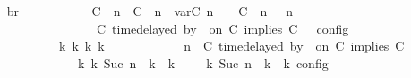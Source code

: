 \begin{isabellebody}
\ \isamarkupfalse%
\ br{}{\isacharprime}{\isacharcolon}\isanewline
\ \ \ \ \ \ \ \ {\isacartoucheopen}{\isasymrho}\ {\isasymin}\ {\isasymlbrakk}\ {\isacharparenleft}{\isacharparenleft}C\ {\isasymUp}\ n{\isacharparenright}\ {\isacharhash}\ {\isacharparenleft}C\ {\isasymDown}\ n\ {\isacharat}{\isasymsharp}\ {\isasymlparr}{\isasymtau}\isactrlsub v\isactrlsub a\isactrlsub r{\isacharparenleft}C\ n{\isacharparenright}\ {\isasymoplus}\ {\isasymdelta}{\isasymtau}{\isasymrparr}{\isacharparenright}\ {\isacharhash}\ {\isacharparenleft}C\ {\isasymUp}\ n{\isacharparenright}\ {\isacharhash}\ {\isasymGamma}{\isacharparenright}{\isacharcomma}\ n\isanewline
\ \ \ \ \ \ \ \ \ \ \ \ \ \ {\isasymturnstile}\ {\isasymPsi}\ {\isasymtriangleright}\ {\isacharparenleft}{\isacharparenleft}C\ time{\isacharminus}delayed{\isasymbowtie}\ by\ {\isasymdelta}{\isasymtau}\ on\ C\ implies\ C\ {\isacharhash}\ {\isasymPhi}{\isacharparenright}\ {\isasymrbrakk}\isactrlsub c\isactrlsub o\isactrlsub n\isactrlsub f\isactrlsub i\isactrlsub g\isanewline
\ \ \ \ \ \ \ \ \ \ {\isasymLongrightarrow}\ {\isasymexists}{\isasymGamma}\isactrlsub k\ {\isasymPsi}\isactrlsub k\ {\isasymPhi}\isactrlsub k\ k{\isachardot}\isanewline
\ \ \ \ \ \ \ \ \ \ \ {\isacharparenleft}{\isacharparenleft}{\isasymGamma}{\isacharcomma}\ n\ {\isasymturnstile}\ {\isacharparenleft}{\isacharparenleft}C\ time{\isacharminus}delayed{\isasymbowtie}\ by\ {\isasymdelta}{\isasymtau}\ on\ C\ implies\ C\ {\isacharhash}\ {\isasymPsi}{\isacharparenright}\ {\isasymtriangleright}\ {\isasymPhi}{\isacharparenright}\isanewline
\ \ \ \ \ \ \ \ \ \ \ \ \ \ {\isasymhookrightarrow}\isactrlbsup k\isactrlesup \ {\isacharparenleft}{\isasymGamma}\isactrlsub k{\isacharcomma}\ Suc\ n\ {\isasymturnstile}\ {\isasymPsi}\isactrlsub k\ {\isasymtriangleright}\ {\isasymPhi}\isactrlsub k{\isacharparenright}{\isacharparenright}\ {\isasymand}\ {\isasymrho}\ {\isasymin}\ {\isasymlbrakk}\ {\isasymGamma}\isactrlsub k{\isacharcomma}\ Suc\ n\ {\isasymturnstile}\ {\isasymPsi}\isactrlsub k\ {\isasymtriangleright}\ {\isasymPhi}\isactrlsub k\ {\isasymrbrakk}\isactrlsub c\isactrlsub o\isactrlsub n\isactrlsub f\isactrlsub i\isactrlsub g{\isacartoucheclose}\isanewline
\ \ \ \ \ \ \ \ \isamarkupfalse%
\ {\isacharminus}\isanewline

\end{isabellebody}
